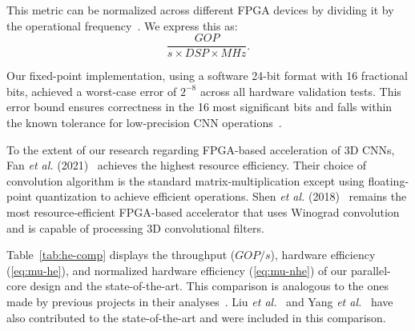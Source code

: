 %

This metric can be normalized across different FPGA devices by dividing it by the operational frequency~\cite{meyer2020evaluating, montgomerie2023pass, jiang2025fpga}. We express this as:
%
\begin{equation}\label{eq:mu-nhe}
  \frac{GOP}{s{\times}DSP{\times}MHz}.
\end{equation}

%

Our fixed-point implementation, using a software 24-bit format with 16 fractional bits, achieved a worst-case error of $2^{-8}$ across all hardware validation tests. This error bound ensures correctness in the 16 most significant bits and falls within the known tolerance for low-precision CNN operations~\cite{courbariaux2014training}.

To the extent of our research regarding FPGA-based acceleration of 3D CNNs, Fan \textit{et al.} (2021)~\cite{fan2021high} achieves the highest resource efficiency. Their choice of convolution algorithm is the standard matrix-multiplication except using floating-point quantization to achieve efficient operations. Shen \textit{et al.} (2018)~\cite{shen2018towards} remains the most resource-efficient FPGA-based accelerator that uses Winograd convolution and is capable of processing 3D convolutional filters.

Table~\ref{tab:he-comp} displays the throughput ($GOP/s$), hardware efficiency (\ref{eq:mu-he}), and normalized hardware efficiency (\ref{eq:mu-nhe}) of our parallel-core design and the state-of-the-art. This comparison is analogous to the ones made by previous projects in their analyses~\cite{shen2018towards,fan2021high}. Liu \textit{et al.}~\cite{liu2019uniform} and Yang \textit{et al.}~\cite{yang2023fgpa} have also contributed to the state-of-the-art and were included in this comparison.

